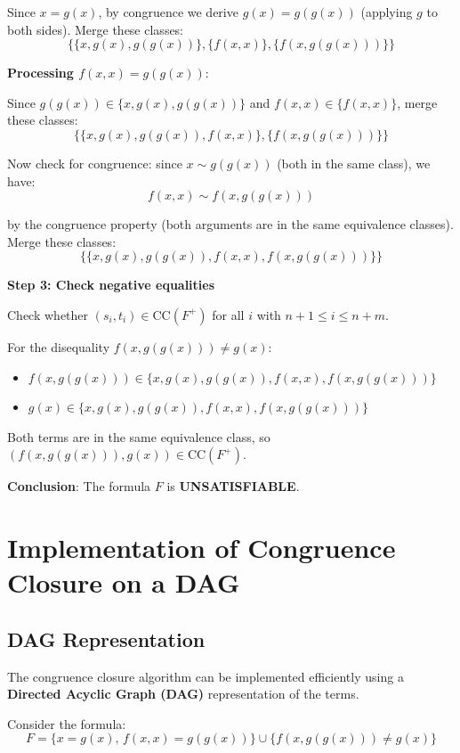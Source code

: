 \documentclass[11pt,a4paper]{article}
\theoremstyle{definition}
\theoremstyle{plain}
\theoremstyle{remark}
\begin{document}
Since $x = g(x)$, by congruence we derive $g(x) = g(g(x))$ (applying $g$ to both sides). Merge these classes:
\[
\{\{x, g(x), g(g(x))\}, \{f(x, x)\}, \{f(x, g(g(x)))\}\}
\]

\textbf{Processing $f(x, x) = g(g(x))$}:

Since $g(g(x)) \in \{x, g(x), g(g(x))\}$ and $f(x, x) \in \{f(x, x)\}$, merge these classes:
\[
\{\{x, g(x), g(g(x)), f(x, x)\}, \{f(x, g(g(x)))\}\}
\]

Now check for congruence: since $x \sim g(g(x))$ (both in the same class), we have:
\[
f(x, x) \sim f(x, g(g(x)))
\]

by the congruence property (both arguments are in the same equivalence classes). Merge these classes:
\[
\{\{x, g(x), g(g(x)), f(x, x), f(x, g(g(x)))\}\}
\]

\textbf{Step 3: Check negative equalities}

Check whether $(s_i, t_i) \in \text{CC}(F^+)$ for all $i$ with $n+1 \leq i \leq n+m$.

For the disequality $f(x, g(g(x))) \neq g(x)$:
\begin{itemize}
    \item $f(x, g(g(x))) \in \{x, g(x), g(g(x)), f(x, x), f(x, g(g(x)))\}$
    \item $g(x) \in \{x, g(x), g(g(x)), f(x, x), f(x, g(g(x)))\}$
\end{itemize}

Both terms are in the same equivalence class, so $(f(x, g(g(x))), g(x)) \in \text{CC}(F^+)$.

\textbf{Conclusion}: The formula $F$ is \textbf{UNSATISFIABLE}.




\newpage

\section{Implementation of Congruence Closure on a DAG}

\subsection{DAG Representation}

The congruence closure algorithm can be implemented efficiently using a \textbf{Directed Acyclic Graph (DAG)} representation of the terms.

Consider the formula:
\[
F = \{x = g(x), \, f(x, x) = g(g(x))\} \cup \{f(x, g(g(x))) \neq g(x)\}
\]
\end{document}
